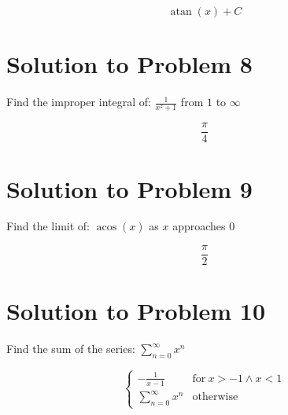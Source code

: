 \documentclass{article}
\begin{document}
\[ \operatorname{atan}{\left(x \right)} + C \]

\section*{Solution to Problem 8}
Find the improper integral of: $\frac{1}{x^{2} + 1}$ from $1$ to $\infty$

\[ \frac{\pi}{4} \]

\section*{Solution to Problem 9}
Find the limit of: $\operatorname{acos}{\left(x \right)}$ as $x$ approaches $0$

\[ \frac{\pi}{2} \]

\section*{Solution to Problem 10}
Find the sum of the series: $\sum_{n=0}^{\infty} x^{n}$

\[ \begin{cases} - \frac{1}{x - 1} & \text{for}\: x > -1 \wedge x < 1 \\\sum_{n=0}^{\infty} x^{n} & \text{otherwise} \end{cases} \]
\end{document}
